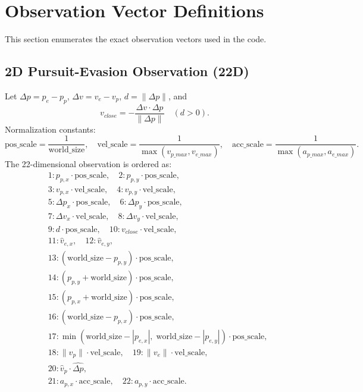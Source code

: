 \documentclass[11pt]{article}
\begin{document}
\section{Observation Vector Definitions}
This section enumerates the exact observation vectors used in the code.

\subsection{2D Pursuit-Evasion Observation (22D)}
Let $\Delta p = p_e - p_p$, $\Delta v = v_e - v_p$, $d = \|\Delta p\|$, and
\begin{equation}
 v_{close} = -\frac{\Delta v \cdot \Delta p}{\|\Delta p\|} \quad (d>0).
\end{equation}
Normalization constants:
\begin{equation}
\text{pos\_scale}=\frac{1}{\text{world\_size}},\quad
\text{vel\_scale}=\frac{1}{\max(v_{p\_max}, v_{e\_max})},\quad
\text{acc\_scale}=\frac{1}{\max(a_{p\_max}, a_{e\_max})}.
\end{equation}
The 22-dimensional observation is ordered as:
\begin{align*}
&1: p_{p,x}\cdot\text{pos\_scale}, \quad
2: p_{p,y}\cdot\text{pos\_scale}, \\
&3: v_{p,x}\cdot\text{vel\_scale}, \quad
4: v_{p,y}\cdot\text{vel\_scale}, \\
&5: \Delta p_x\cdot\text{pos\_scale}, \quad
6: \Delta p_y\cdot\text{pos\_scale}, \\
&7: \Delta v_x\cdot\text{vel\_scale}, \quad
8: \Delta v_y\cdot\text{vel\_scale}, \\
&9: d\cdot\text{pos\_scale}, \quad
10: v_{close}\cdot\text{vel\_scale}, \\
&11: \hat{v}_{e,x}, \quad
12: \hat{v}_{e,y}, \\
&13: (\text{world\_size} - p_{p,y})\cdot\text{pos\_scale}, \\
&14: (p_{p,y} + \text{world\_size})\cdot\text{pos\_scale}, \\
&15: (p_{p,x} + \text{world\_size})\cdot\text{pos\_scale}, \\
&16: (\text{world\_size} - p_{p,x})\cdot\text{pos\_scale}, \\
&17: \min(\text{world\_size}-|p_{e,x}|,\;\text{world\_size}-|p_{e,y}|)\cdot\text{pos\_scale}, \\
&18: \|v_p\|\cdot\text{vel\_scale}, \quad
19: \|v_e\|\cdot\text{vel\_scale}, \\
&20: \hat{v}_p\cdot\hat{\Delta p}, \\
&21: a_{p,x}\cdot\text{acc\_scale}, \quad
22: a_{p,y}\cdot\text{acc\_scale}.
\end{align*}
\end{document}
